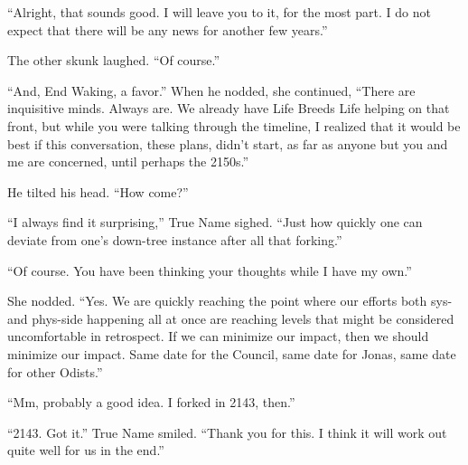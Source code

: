 ``Alright, that sounds good. I will leave you to it, for the most part. I do not expect that there will be any news for another few years.''

The other skunk laughed. ``Of course.''

``And, End Waking, a favor.'' When he nodded, she continued, ``There are inquisitive minds. Always are. We already have Life Breeds Life helping on that front, but while you were talking through the timeline, I realized that it would be best if this conversation, these plans, didn't start, as far as anyone but you and me are concerned, until perhaps the 2150s.''

He tilted his head. ``How come?''

``I always find it surprising,'' True Name sighed. ``Just how quickly one can deviate from one's down-tree instance after all that forking.''

``Of course. You have been thinking your thoughts while I have my own.''

She nodded. ``Yes. We are quickly reaching the point where our efforts both sys- and phys-side happening all at once are reaching levels that might be considered uncomfortable in retrospect. If we can minimize our impact, then we should minimize our impact. Same date for the Council, same date for Jonas, same date for other Odists.''

``Mm, probably a good idea. I forked in 2143, then.''

``2143. Got it.'' True Name smiled. ``Thank you for this. I think it will work out quite well for us in the end.''
